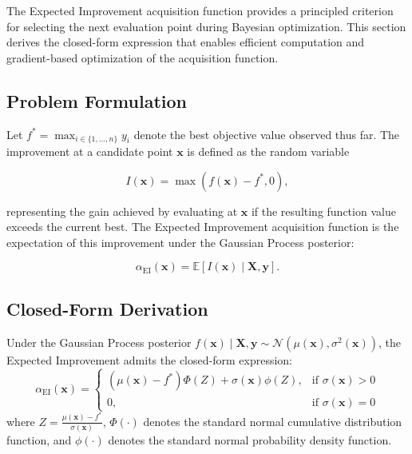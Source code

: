 The Expected Improvement acquisition function provides a principled criterion for selecting the next evaluation point during Bayesian optimization. This section derives the closed-form expression that enables efficient computation and gradient-based optimization of the acquisition function.

\subsection{Problem Formulation}

Let $f^* = \max_{i \in \{1, \ldots, n\}} y_i$ denote the best objective value observed thus far. The improvement at a candidate point $\mathbf{x}$ is defined as the random variable

\begin{equation}
I(\mathbf{x}) = \max\left(f(\mathbf{x}) - f^*, 0\right),
\end{equation}

representing the gain achieved by evaluating at $\mathbf{x}$ if the resulting function value exceeds the current best. The Expected Improvement acquisition function is the expectation of this improvement under the Gaussian Process posterior:

\begin{equation}
\alpha_{\text{EI}}(\mathbf{x}) = \mathbb{E}\left[I(\mathbf{x}) \mid \mathbf{X}, \mathbf{y}\right].
\end{equation}

\subsection{Closed-Form Derivation}

\begin{theorem}
\label{thm:ei_formula}
Under the Gaussian Process posterior $f(\mathbf{x}) \mid \mathbf{X}, \mathbf{y} \sim \mathcal{N}(\mu(\mathbf{x}), \sigma^2(\mathbf{x}))$, the Expected Improvement admits the closed-form expression:
\begin{equation}
\alpha_{\text{EI}}(\mathbf{x}) =
\begin{cases}
(\mu(\mathbf{x}) - f^*) \Phi(Z) + \sigma(\mathbf{x}) \phi(Z), & \text{if } \sigma(\mathbf{x}) > 0 \\
0, & \text{if } \sigma(\mathbf{x}) = 0
\end{cases}
\end{equation}
where $Z = \frac{\mu(\mathbf{x}) - f^*}{\sigma(\mathbf{x})}$, $\Phi(\cdot)$ denotes the standard normal cumulative distribution function, and $\phi(\cdot)$ denotes the standard normal probability density function.
\end{theorem}

